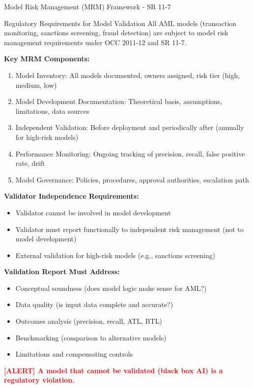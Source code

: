 \documentclass[11pt,a4paper]{beamer}
\newcommand{\redflag}[1]{\textcolor{red}{\textbf{[ALERT] #1}}}
\begin{document}
	\begin{frame}{Model Risk Management (MRM) Framework - SR 11-7}
		\begin{block}{Regulatory Requirements for Model Validation}
			All AML models (transaction monitoring, sanctions screening, fraud detection) are subject to model risk management requirements under OCC 2011-12 and SR 11-7.
		\end{block}
		
		\textbf{Key MRM Components:}
		\begin{enumerate}
			\item Model Inventory: All models documented, owners assigned, risk tier (high, medium, low)
			\item Model Development Documentation: Theoretical basis, assumptions, limitations, data sources
			\item Independent Validation: Before deployment and periodically after (annually for high-risk models)
			\item Performance Monitoring: Ongoing tracking of precision, recall, false positive rate, drift
			\item Model Governance: Policies, procedures, approval authorities, escalation path
		\end{enumerate}
		
		\textbf{Validator Independence Requirements:}
		\begin{itemize}
			\item Validator cannot be involved in model development
			\item Validator must report functionally to independent risk management (not to model development)
			\item External validation for high-risk models (e.g., sanctions screening)
		\end{itemize}
		
		\textbf{Validation Report Must Address:}
		\begin{itemize}
			\item Conceptual soundness (does model logic make sense for AML?)
			\item Data quality (is input data complete and accurate?)
			\item Outcomes analysis (precision, recall, ATL, BTL)
			\item Benchmarking (comparison to alternative models)
			\item Limitations and compensating controls
		\end{itemize}
		
		\redflag{A model that cannot be validated (black box AI) is a regulatory violation.}
	\end{frame}
	
\end{document}
